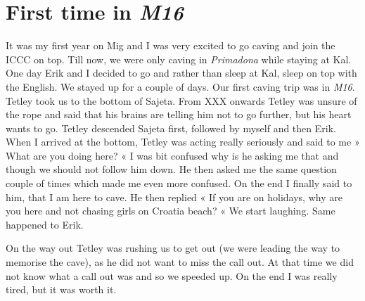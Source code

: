 \section{\texorpdfstring{First time in
\emph{M16}}{First time in M16}}

It was my first year on Mig and I was very excited to go caving and join
the ICCC on top. Till now, we were only caving in \emph{Primadona} while
staying at Kal. One day Erik and I decided to go and rather than sleep
at Kal, sleep on top with the English. We stayed up for a couple of
days. Our first caving trip was in \emph{M16}. Tetley took us to the
bottom of Sajeta. From XXX onwards Tetley was unsure of the rope and
said that his brains are telling him not to go further, but his heart
wants to go. Tetley descended Sajeta first, followed by myself and then
Erik. When I arrived at the bottom, Tetley was acting really seriously
and said to me » What are you doing here? « I was bit confused why is he
asking me that and though we should not follow him down. He then asked
me the same question couple of times which made me even more confused.
On the end I finally said to him, that I am here to cave. He then
replied « If you are on holidays, why are you here and not chasing girls
on Croatia beach? « We start laughing. Same happened to Erik.

On the way out Tetley was rushing us to get out (we were leading the way
to memorise the cave), as he did not want to miss the call out. At that
time we did not know what a call out was and so we speeded up. On the
end I was really tired, but it was worth it.

